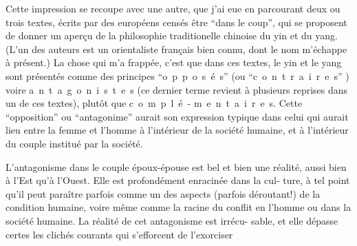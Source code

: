 Cette impression se recoupe avec une autre, que j'ai eue en parcourant deux
ou trois textes, écrits par des européens censés être ``dans le coup'', qui se
proposent de donner un aperçu de la philosophie traditionelle chinoise du yin
et du yang. (L'un des auteurs est un orientaliste français bien connu, dont
le nom m'échappe à présent.) La chose qui m'a frappée, c'est que dans ces textes,
le yin et le yang sont présentés comme des principes ``\mbox{o p p o s é s}'' (ou
``\mbox{c o n t r a i r e s}'' ) voire \mbox{a n t a g o n i s t e s} (ce dernier terme
revient à plusieurs reprises dans un de ces textes), plutôt que \mbox{c o m p l é -}
\mbox{m e n t a i r e s}. Cette ``opposition'' ou ``antagonime'' aurait son expression
typique dans celui qui aurait lieu entre la femme et l'homme à l'intérieur de
la société humaine, et à l'intérieur du couple institué par la société.

L'antagonisme dans le couple époux-épouse est bel et bien une réalité,
aussi bien à l'Est qu'à l'Ouest. Elle est profondément enracinée dans la cul-
ture, à tel point qu'il peut paraître parfois comme un des aspects (parfois
déroutant!) de la condition humaine, voire même comme la racine du conflit en
l'homme ou dans la société humaine. La réalité de cet antagonisme est irrécu-
sable, et elle dépasse certes les clichés courants qui s'efforcent de l'exorciser
